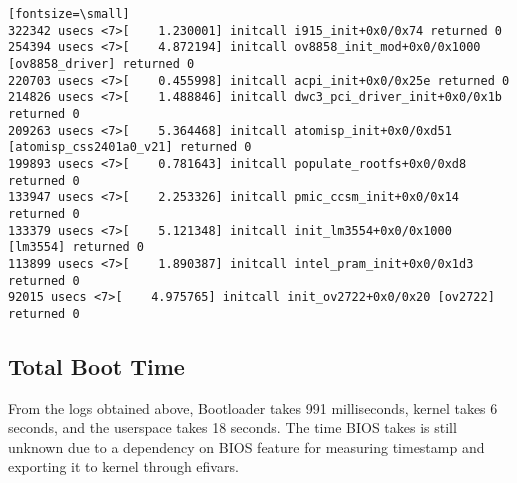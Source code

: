 \begin{verbatim}[fontsize=\small]
322342 usecs <7>[    1.230001] initcall i915_init+0x0/0x74 returned 0
254394 usecs <7>[    4.872194] initcall ov8858_init_mod+0x0/0x1000 [ov8858_driver] returned 0
220703 usecs <7>[    0.455998] initcall acpi_init+0x0/0x25e returned 0
214826 usecs <7>[    1.488846] initcall dwc3_pci_driver_init+0x0/0x1b returned 0
209263 usecs <7>[    5.364468] initcall atomisp_init+0x0/0xd51 [atomisp_css2401a0_v21] returned 0
199893 usecs <7>[    0.781643] initcall populate_rootfs+0x0/0xd8 returned 0
133947 usecs <7>[    2.253326] initcall pmic_ccsm_init+0x0/0x14 returned 0
133379 usecs <7>[    5.121348] initcall init_lm3554+0x0/0x1000 [lm3554] returned 0
113899 usecs <7>[    1.890387] initcall intel_pram_init+0x0/0x1d3 returned 0
92015 usecs <7>[    4.975765] initcall init_ov2722+0x0/0x20 [ov2722] returned 0
\end{verbatim}

\subsection{Total Boot Time}

From the logs obtained above, Bootloader takes 991 milliseconds,
kernel takes 6 seconds, and the userspace takes 18 seconds. The time
BIOS takes is still unknown due to a dependency on BIOS feature for
measuring timestamp and exporting it to kernel through efivars.

